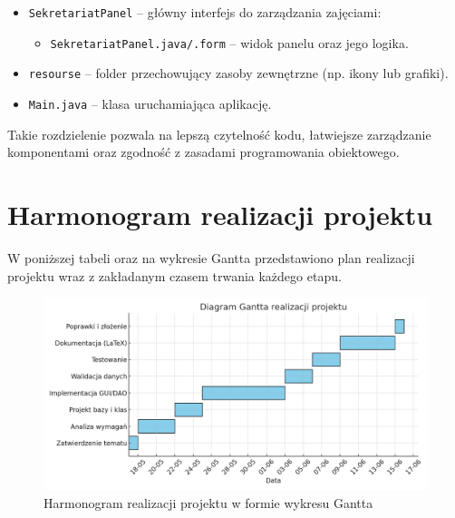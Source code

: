 \begin{itemize}
    \item \texttt{SekretariatPanel} – główny interfejs do zarządzania zajęciami:
    \begin{itemize}
        \item \texttt{SekretariatPanel.java/.form} – widok panelu oraz jego logika.
    \end{itemize}

    \item \texttt{resourse} – folder przechowujący zasoby zewnętrzne (np. ikony lub grafiki).

    \item \texttt{Main.java} – klasa uruchamiająca aplikację.
\end{itemize}

Takie rozdzielenie pozwala na lepszą czytelność kodu, łatwiejsze zarządzanie komponentami oraz zgodność z zasadami programowania obiektowego.

\chapter{Harmonogram realizacji projektu}

W poniższej tabeli oraz na wykresie Gantta przedstawiono plan realizacji projektu wraz z zakładanym czasem trwania każdego etapu.

\begin{figure}[H]
    \centering
    \includegraphics[width=\textwidth]{figures/diagram_gantta_colored_fixed.png}
    \caption{Harmonogram realizacji projektu w formie wykresu Gantta}
    \label{fig:gantt_diagram}
\end{figure}
